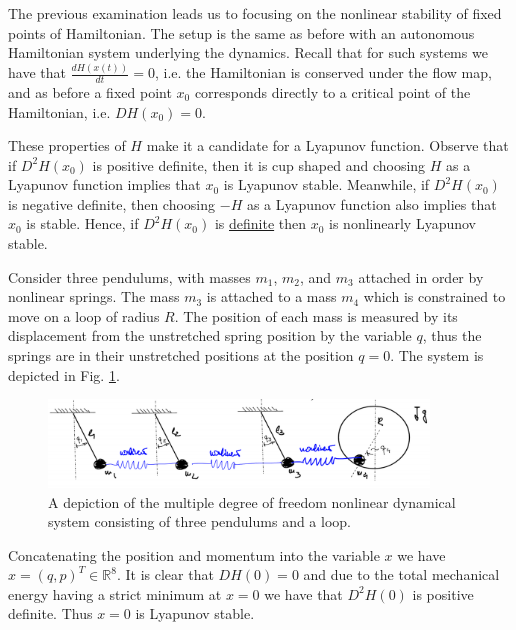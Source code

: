 The previous examination leads us to focusing on the nonlinear stability of fixed points of Hamiltonian. The setup is the same as before with an autonomous Hamiltonian system underlying the dynamics. Recall that for such systems we have that $\frac{dH(x(t))}{dt}=0$, i.e. the Hamiltonian is conserved under the flow map, and as before a fixed point $x_0$ corresponds directly to a critical point of the Hamiltonian, i.e. $DH(x_0)=0$.

These properties of $H$ make it a candidate for a Lyapunov function. Observe that if $D^{2}H(x_0)$ is positive definite, then it is cup shaped and choosing $H$ as a Lyapunov function implies that $x_0$ is Lyapunov stable. Meanwhile, if $D^{2}H(x_0)$ is negative definite, then choosing $-H$ as a Lyapunov function also implies that $x_0$ is stable. Hence, if $D^2H(x_0)$ is \underline{definite} then $x_0$ is nonlinearly Lyapunov stable.

\begin{ex}
	Consider three pendulums, with masses $m_1$, $m_2$, and $m_3$ attached in order by nonlinear springs. The mass $m_3$ is attached to a mass $m_4$ which is constrained to move on a loop of radius $R$. The position of each mass is measured by its displacement from the unstretched spring position by the variable $q$, thus the springs are in their unstretched positions at the position $q=0$. The system is depicted in Fig. \ref{fig:multi_dof_mech}.
\begin{figure}[h!]
	\centering
	\includegraphics[width=0.9\textwidth]{figures/ch8/17multi_dof_mech.png}
	\caption{A depiction of the multiple degree of freedom nonlinear dynamical system consisting of three pendulums and a loop.}
	\label{fig:multi_dof_mech}
\end{figure}

Concatenating the position and momentum into the variable $x$ we have $x=(q,p)^{T}\in \mathbb{R}^{8}$. It is clear that $DH(0) = 0$ and due to the total mechanical energy having a strict minimum at $x=0$ we have that $D^2H(0)$ is positive definite. Thus $x=0$ is Lyapunov stable.
\end{ex}

